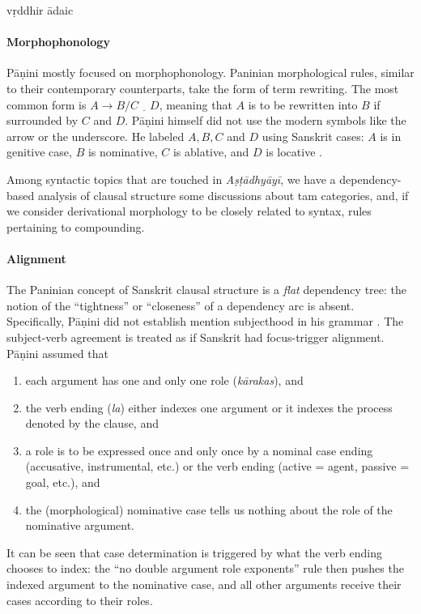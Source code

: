 \documentclass[a4paper, oneside, 12pt]{report}
\newcommand{\form}[1]{\emph{#1}}
\newcommand*{\source}[1]{\textit{#1}}
\begin{document}
\begin{exe}
    \ex\label{ex:sutra-1-1-1} vṛddhir ādaic
\end{exe}

\paragraph*{Morphophonology} Pāṇini mostly focused on morphophonology.
Paninian morphological rules, similar to their contemporary counterparts,
take the form of term rewriting. 
The most common form is $A \to B / C \underline{\quad} D $,
meaning that $A$ is to be rewritten into $B$ if surrounded by $C$ and $D$.
Pāṇini himself did not use the modern symbols like the arrow or the underscore.
He labeled $A, B, C$ and $D$ using Sanskrit cases:
$A$ is in genitive case, $B$ is nominative, $C$ is ablative, and $D$ is locative
\citep{kiparsky1995painian}.

Among syntactic topics that are touched in \source{Aṣṭādhyāyī},
we have a dependency-based analysis of clausal structure
some discussions about \ac{tam} categories,
and, if we consider derivational morphology to be closely related to syntax,
rules pertaining to compounding.

\paragraph*{Alignment}
The Paninian concept of Sanskrit clausal structure is a \emph{flat} dependency tree:
the notion of the ``tightness'' or ``closeness'' of a dependency arc is absent.
Specifically, Pāṇini did not establish mention subjecthood in his grammar \citep{kiparsky2009architecture}.
The subject-verb agreement is treated as if Sanskrit had focus-trigger alignment.
Pāṇini assumed that 
\begin{enumerate}
    \item each argument has one and only one role (\form{kārakas}), and
    \item the verb ending (\form{la}) either indexes one argument or it indexes the process denoted by the clause, and
    \item a role is to be expressed once and only once by a nominal case ending (accusative, instrumental, etc.) 
    or the verb ending (active = agent, passive = goal, etc.), and
    \item the (morphological) nominative case tells us nothing about the role of the nominative argument.
\end{enumerate}
It can be seen that case determination is triggered by what the verb ending chooses to index:
the ``no double argument role exponents'' rule then pushes the indexed argument to the nominative case,
and all other arguments receive their cases according to their roles.
\end{document}
